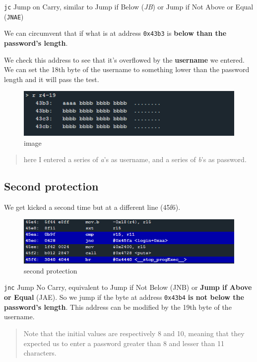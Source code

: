 \documentclass[a4paper,11pt]{article}
\begin{document}
\texttt{jc} Jump on Carry, similar to Jump if Below (\emph{JB}) or Jump
if Not Above or Equal (\texttt{JNAE})

We can circumvent that if what is at address \texttt{0x43b3} is
\textbf{below than the password's length}.

We check this address to see that it's overflowed by the
\textbf{username} we entered. We can set the 18th byte of the username
to something lower than the password length and it will pass the test.

\begin{figure}[htbp]
\centering
\includegraphics{img/10_2.PNG}
\caption{image}
\end{figure}

\begin{quote}
here I entered a series of \emph{a}'s as username, and a series of
\emph{b}'s as password.
\end{quote}

\subsection{Second protection}\label{second-protection}

We get kicked a second time but at a different line (45f6).

\begin{figure}[htbp]
\centering
\includegraphics{img/10_3.PNG}
\caption{second protection}
\end{figure}

\texttt{jnc} Jump No Carry, equivalent to Jump if Not Below (JNB) or
\textbf{Jump if Above or Equal} (JAE). So we jump if the byte at address
\texttt{0x43b4} \textbf{is not below the password's length}. This
address can be modified by the 19th byte of the username.

\begin{quote}
Note that the initial values are respectively 8 and 10, meaning that
they expected us to enter a password greater than 8 and lesser than 11
characters.
\end{quote}
\end{document}
